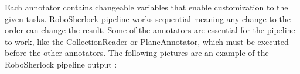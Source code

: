 \documentclass[main.tex]{subfiles}
\begin{document}
Each annotator contains changeable variables that enable customization to the given tasks.
RoboSherlock pipeline works sequential meaning any change to the order can change the result. Some of the annotators are essential for the pipeline to work, like the CollectionReader or PlaneAnnotator, which must be executed before the other annotators. 
The following pictures are an example of the RoboSherlock pipeline output :  \\

\begin{figure}[H]
     \begin{center}
%
        \\ %
\end{center}
\end{figure}
\end{document}
